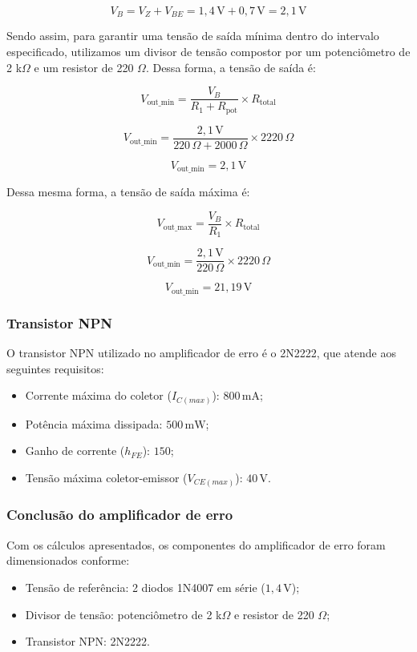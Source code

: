 \[
V_B = V_{Z} + V_{BE} = 1,4 \, \text{V} + 0,7 \, \text{V} = 2,1 \, \text{V}
\]

Sendo assim, para garantir uma tensão de saída mínima dentro do intervalo especificado, utilizamos um divisor de tensão compostor por um potenciômetro de 2 k\(\Omega\) e um resistor de 220 \(\Omega\). Dessa forma, a tensão de saída é:

\[
V_{\text{out\_min}} = \frac{V_B}{R_1 + R_{\text{pot}}} \times R_{\text{total}}
\]

\[
V_{\text{out\_min}} = \frac{2,1 \, \text{V}}{220 \, \Omega + 2000 \, \Omega} \times 2220 \, \Omega
\]

\[
V_{\text{out\_min}} = 2,1 \, \text{V}
\]

Dessa mesma forma, a tensão de saída máxima é:

\[
V_{\text{out\_max}} = \frac{V_B}{R_1} \times R_{\text{total}}
\]

\[
V_{\text{out\_min}} = \frac{2,1 \, \text{V}}{220 \, \Omega} \times 2220 \, \Omega
\]

\[
V_{\text{out\_min}} = 21,19 \, \text{V}
\]

\subsubsection*{Transistor NPN}

O transistor NPN utilizado no amplificador de erro é o 2N2222, que atende aos seguintes requisitos:

\begin{itemize}
    \item Corrente máxima do coletor (\(I_{C(max)}\)): \(800 \, \text{mA}\);
    \item Potência máxima dissipada: \(500 \, \text{mW}\);
    \item Ganho de corrente (\(h_{FE}\)): \(150\);
    \item Tensão máxima coletor-emissor (\(V_{CE(max)}\)): \(40 \, \text{V}\).
\end{itemize}

\subsubsection*{Conclusão do amplificador de erro}

Com os cálculos apresentados, os componentes do amplificador de erro foram dimensionados conforme:

\begin{itemize}
    \item Tensão de referência: 2 diodos 1N4007 em série (\(1,4 \, \text{V}\));
    \item Divisor de tensão: potenciômetro de 2 k\(\Omega\) e resistor de 220 \(\Omega\);
    \item Transistor NPN: 2N2222.
\end{itemize}

